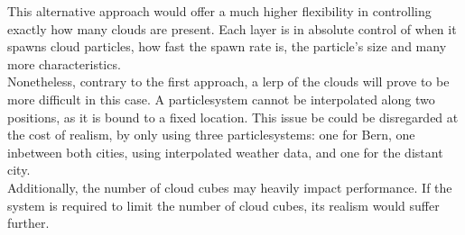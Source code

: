 \begin{figure}[H]
    \centering
    \label{img:tikz:altapproach}       
\end{figure}

\noindent
This alternative approach would offer a much higher flexibility in controlling exactly how many clouds are present.
Each layer is in absolute control of when it spawns cloud particles, how fast the spawn rate is, the particle's size and many more characteristics. 
\\
Nonetheless, contrary to the first approach, a \gls{lerp} of the clouds will prove to be more difficult in this case.
A \gls{particlesystem} cannot be interpolated along two positions, as it is bound to a fixed location.
This issue be could be disregarded at the cost of realism, by only using three \gls{particlesystem}s:
one for Bern, one inbetween both cities, using interpolated weather data, and one for the distant city.
\\
Additionally, the number of cloud cubes may heavily impact performance. If the system is required to limit the number of cloud cubes, its realism would suffer further.